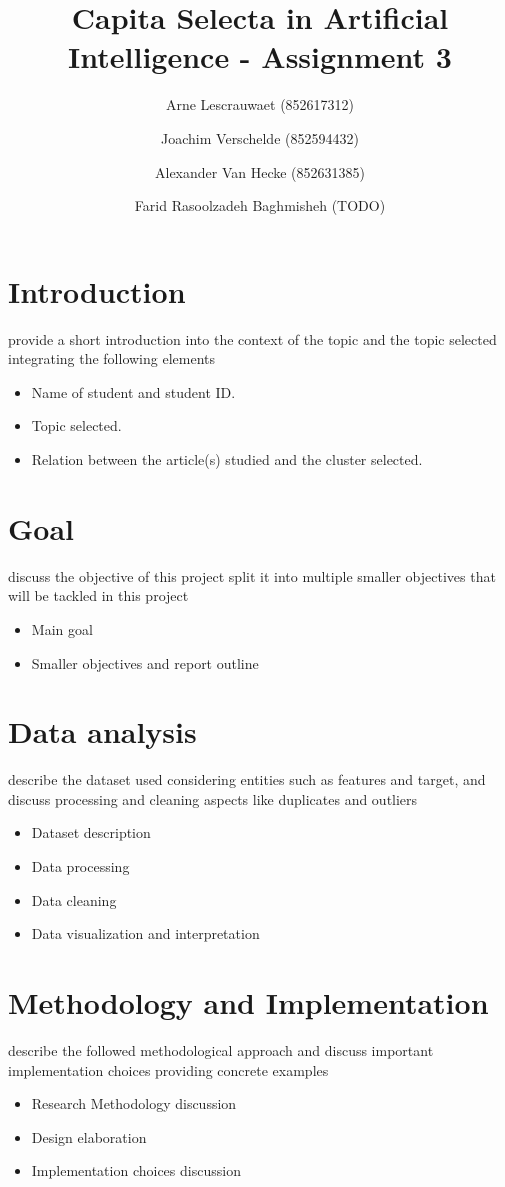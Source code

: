 \documentclass[]{article}
\title{Capita Selecta in Artificial Intelligence - Assignment 3}
\author{Arne Lescrauwaet \small(852617312) \and Joachim Verschelde \small(852594432) \and Alexander Van Hecke \small(852631385) \and Farid Rasoolzadeh Baghmisheh \small(TODO)}
\begin{document}
\maketitle

\section{Introduction}
provide a short introduction into the context of the topic and the topic selected integrating the following elements
\begin{itemize}
    \item Name of student and student ID.
    \item Topic selected.
    \item Relation between the article(s) studied and the cluster selected.
\end{itemize}

\section{Goal}
discuss the objective of this project split it into multiple smaller objectives that will be tackled in this project
\begin{itemize}
    \item Main goal
    \item Smaller objectives and report outline
\end{itemize}

\section{Data analysis}

describe the dataset used considering entities such as features and target, and discuss processing and cleaning aspects like duplicates and outliers
\begin{itemize}
    \item Dataset description
    \item Data processing
    \item Data cleaning
    \item Data visualization and interpretation
\end{itemize}

\section{Methodology and Implementation}
describe the followed methodological approach and discuss important implementation choices providing concrete examples
\begin{itemize}
    \item Research Methodology discussion
    \item Design elaboration
    \item Implementation choices discussion
\end{itemize}
\end{document}
